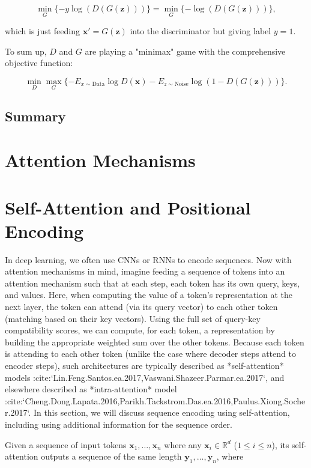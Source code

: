$$ \min_G \{ - y \log(D(G(\mathbf z))) \} = \min_G \{ - \log(D(G(\mathbf z))) \}, $$

which is just feeding $\mathbf x'=G(\mathbf z)$ into the discriminator but giving label $y=1$.


To sum up, $D$ and $G$ are playing a "minimax" game with the comprehensive objective function:

$$\min_D \max_G \{ -E_{x \sim \text{Data}} \log D(\mathbf x) - E_{z \sim \text{Noise}} \log(1 - D(G(\mathbf z))) \}.$$

\subsection{Summary}
\label{subsec:3_gans_summary}

\section{Attention Mechanisms}
\label{sec:3_attention}

\section{Self-Attention and Positional Encoding}
\label{sec:3_self_attention_pos_encoding}

In deep learning, we often use CNNs or RNNs to encode sequences.
Now with attention mechanisms in mind, 
imagine feeding a sequence of tokens 
into an attention mechanism
such that at each step,
each token has its own query, keys, and values.
Here, when computing the value of a token's representation at the next layer,
the token can attend (via its query vector) to each other token 
(matching based on their key vectors).
Using the full set of query-key compatibility scores,
we can compute, for each token, a representation
by building the appropriate weighted sum
over the other tokens. 
Because each token is attending to each other token
(unlike the case where decoder steps attend to encoder steps),
such architectures are typically described as *self-attention* models :cite:`Lin.Feng.Santos.ea.2017,Vaswani.Shazeer.Parmar.ea.2017`, 
and elsewhere described as *intra-attention* model :cite:`Cheng.Dong.Lapata.2016,Parikh.Tackstrom.Das.ea.2016,Paulus.Xiong.Socher.2017`.
In this section, we will discuss sequence encoding using self-attention,
including using additional information for the sequence order.

Given a sequence of input tokens
$\mathbf{x}_1, \ldots, \mathbf{x}_n$ where any $\mathbf{x}_i \in \mathbb{R}^d$ ($1 \leq i \leq n$),
its self-attention outputs
a sequence of the same length
$\mathbf{y}_1, \ldots, \mathbf{y}_n$,
where

